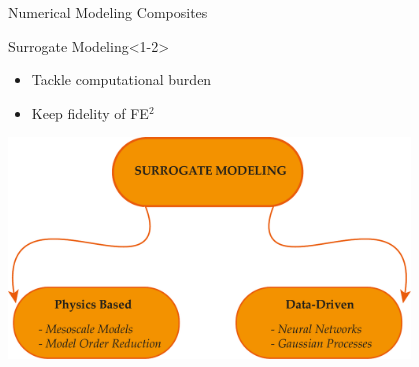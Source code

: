 \begin{frame}{Numerical Modeling Composites}
\begin{minipage}{0.45\textwidth}
  \begin{block}{\color{White}Surrogate Modeling}<1-2>
    \begin{itemize}
      \item <1> Tackle computational burden
      \item <2> Keep fidelity of FE$^2$
    \end{itemize}
  \end{block} 
\end{minipage}%
\hspace{1cm}
\begin{minipage}{0.45\textwidth}
    \centering
    \includegraphics[width=0.8\textwidth]{Figures/intro/surrogate.pdf}
\end{minipage}
\end{frame}



